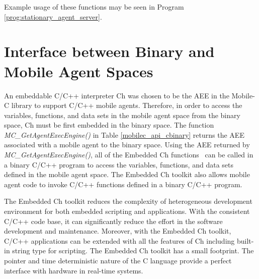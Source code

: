 \documentclass[11pt]{report}
\begin{document}
Example usage of these functions may be seen in Program \ref{prog:stationary_agent_server}.

\chapter{Interface between Binary and Mobile Agent Spaces
\label{chap:interface_binary_to_agent}}
An embeddable C/C++ interpreter Ch was chosen to be the AEE in the Mobile-C 
library to support C/C++ mobile agents. 
Therefore, in order to access the variables, functions, and data sets in 
the mobile agent space from the binary space, Ch must be first embedded in the 
binary space.
The function \textit{MC\_GetAgentExecEngine()}  in 
Table \ref{mobilec_api_cbinary} returns the AEE associated with a mobile agent 
to the binary space.
Using the AEE returned by \textit{MC\_GetAgentExecEngine()}, all of the 
Embedded Ch functions~\cite{EmbeddedCh} can be called in a binary C/C++ 
program to access the variables, functions, and data sets defined in the 
mobile agent space.
The Embedded Ch toolkit also allows mobile agent code to invoke C/C++ 
functions defined in a binary C/C++ program.

The Embedded Ch toolkit reduces the complexity of heterogeneous development 
environment for both embedded scripting and applications. 
With the consistent C/C++ code base, it can significantly reduce the effort 
in the software development and maintenance. 
Moreover, with the Embedded Ch toolkit, C/C++ applications can be extended 
with all the features of Ch including built-in string type for scripting. 
The Embedded Ch toolkit has a small footprint. 
The pointer and time deterministic nature of the C language provide a 
perfect interface with hardware in real-time systems.

\noindent
\end{document}
